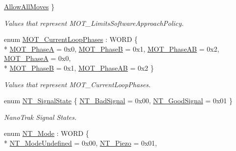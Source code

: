 \begin{DoxyCompactItemize}
\hyperlink{group___common_ggad9af9612d4e18c6cd2e7aaaedd6dc49da9a2933f92f58ac4a4db46005cc29d7ee}{Allow\+All\+Moves}
 \}\begin{DoxyCompactList}\small\item\em Values that represent M\+O\+T\+\_\+\+Limits\+Software\+Approach\+Policy. \end{DoxyCompactList}
\item 
enum \hyperlink{group___common_gab2d264a3167428788845f683b62cf9ef}{M\+O\+T\+\_\+\+Current\+Loop\+Phases} \+: W\+O\+RD \{ \\*
\hyperlink{group___common_ggab2d264a3167428788845f683b62cf9efa19a60a25eb98ca0e4cb0fb8bf4b79bf5}{M\+O\+T\+\_\+\+PhaseA} = 0x0, 
\hyperlink{group___common_ggab2d264a3167428788845f683b62cf9efab4421b1c8eb15cd48614ecfe76815b65}{M\+O\+T\+\_\+\+PhaseB} = 0x1, 
\hyperlink{group___common_ggab2d264a3167428788845f683b62cf9efa08f328e4274855838333f3fa4cf150d9}{M\+O\+T\+\_\+\+Phase\+AB} = 0x2, 
\hyperlink{group___common_ggab2d264a3167428788845f683b62cf9efa19a60a25eb98ca0e4cb0fb8bf4b79bf5}{M\+O\+T\+\_\+\+PhaseA} = 0x0, 
\\*
\hyperlink{group___common_ggab2d264a3167428788845f683b62cf9efab4421b1c8eb15cd48614ecfe76815b65}{M\+O\+T\+\_\+\+PhaseB} = 0x1, 
\hyperlink{group___common_ggab2d264a3167428788845f683b62cf9efa08f328e4274855838333f3fa4cf150d9}{M\+O\+T\+\_\+\+Phase\+AB} = 0x2
 \}\begin{DoxyCompactList}\small\item\em Values that represent M\+O\+T\+\_\+\+Current\+Loop\+Phases. \end{DoxyCompactList}
\item 
enum \hyperlink{group___common_gadf51b72fa3ebcc93399ffb3ea30cbf66}{N\+T\+\_\+\+Signal\+State} \{ \hyperlink{group___common_ggadf51b72fa3ebcc93399ffb3ea30cbf66a853837a6f0b56a11c016a1b6ef835e29}{N\+T\+\_\+\+Bad\+Signal} = 0x00, 
\hyperlink{group___common_ggadf51b72fa3ebcc93399ffb3ea30cbf66a72a309b2e5df3cbb3652ccd933a79678}{N\+T\+\_\+\+Good\+Signal} = 0x01
 \}\begin{DoxyCompactList}\small\item\em Nano\+Trak Signal States. \end{DoxyCompactList}
\item 
enum \hyperlink{group___common_gab868c9a5ae40544a9debc2e28cdef1a8}{N\+T\+\_\+\+Mode} \+: W\+O\+RD \{ \\*
\hyperlink{group___common_ggab868c9a5ae40544a9debc2e28cdef1a8ad73b4b4d1f67eec808561e2d1dcbf905}{N\+T\+\_\+\+Mode\+Undefined} = 0x00, 
\hyperlink{group___common_ggab868c9a5ae40544a9debc2e28cdef1a8ab03d94deb4e5f10d82565786251079fc}{N\+T\+\_\+\+Piezo} = 0x01, 

\end{DoxyCompactItemize}
